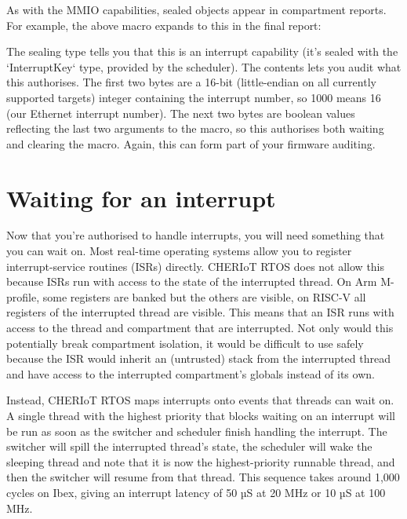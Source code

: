 As with the MMIO capabilities, sealed objects appear in compartment reports.
For example, the above macro expands to this in the final report:

\begin{cxxsnippet}
        {
          "contents": "10000101",
          "kind": "SealedObject",
          "sealing_type": {
            "compartment": "sched",
            "key": "InterruptKey",
            "provided_by": "build/cheriot/cheriot/release/example-firmware.scheduler.compartment",
            "symbol": "__export.sealing_type.sched.InterruptKey"
          \}
\end{cxxsnippet}

The sealing type tells you that this is an interrupt capability (it's sealed with the `InterruptKey` type, provided by the scheduler).
The contents lets you audit what this authorises.
The first two bytes are a 16-bit (little-endian on all currently supported targets) integer containing the interrupt number, so 1000 means 16 (our Ethernet interrupt number).
The next two bytes are boolean values reflecting the last two arguments to the macro, so this authorises both waiting and clearing the macro.
Again, this can form part of your firmware auditing.

\section[label=interrupt_waiting]{Waiting for an interrupt}

Now that you're authorised to handle interrupts, you will need something that you can wait on.
Most real-time operating systems allow you to register interrupt-service routines (ISRs) directly.
CHERIoT RTOS does not allow this because ISRs run with access to the state of the interrupted thread.
On Arm M-profile, some registers are banked but the others are visible, on RISC-V all registers of the interrupted thread are visible.
This means that an ISR runs with access to the thread and compartment that are interrupted.
Not only would this potentially break compartment isolation, it would be difficult to use safely because the ISR would inherit an (untrusted) stack from the interrupted thread and have access to the interrupted compartment's globals instead of its own.

Instead, CHERIoT RTOS maps interrupts onto events that threads can wait on.
A single thread with the highest priority that blocks waiting on an interrupt will be run as soon as the switcher and scheduler finish handling the interrupt.
The switcher will spill the interrupted thread's state, the scheduler will wake the sleeping thread and note that it is now the highest-priority runnable thread, and then the switcher will resume from that thread.
This sequence takes around 1,000 cycles on Ibex, giving an interrupt latency of 50 µS at 20 MHz or 10 µS at 100 MHz.

